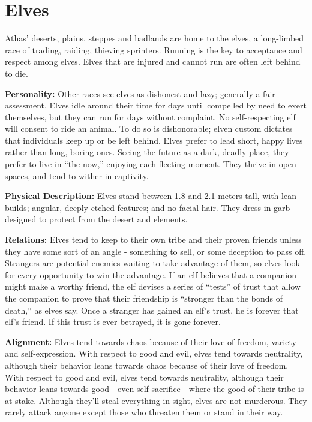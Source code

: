 \section{Elves}

Athas' deserts, plains, steppes and badlands are home to the elves, a long-limbed race of trading, raiding, thieving sprinters. Running is the key to acceptance and respect among elves. Elves that are injured and cannot run are often left behind to die.

\textbf{Personality:} Other races see elves as dishonest and lazy; generally a fair assessment. Elves idle around their time for days until compelled by need to exert themselves, but they can run for days without complaint. No self-respecting elf will consent to ride an animal. To do so is dishonorable; elven custom dictates that individuals keep up or be left behind. Elves prefer to lead short, happy lives rather than long, boring ones. Seeing the future as a dark, deadly place, they prefer to live in ``the now,'' enjoying each fleeting moment. They thrive in open spaces, and tend to wither in captivity.

\textbf{Physical Description:} Elves stand between 1.8 and 2.1 meters tall, with lean builds; angular, deeply etched features; and no facial hair. They dress in garb designed to protect from the desert and elements.

\textbf{Relations:} Elves tend to keep to their own tribe and their proven friends unless they have some sort of an angle - something to sell, or some deception to pass off. Strangers are potential enemies waiting to take advantage of them, so elves look for every opportunity to win the advantage. If an elf believes that a companion might make a worthy friend, the elf devises a series of ``tests'' of trust that allow the companion to prove that their friendship is ``stronger than the bonds of death,'' as elves say. Once a stranger has gained an elf's trust, he is forever that elf's friend. If this trust is ever betrayed, it is gone forever.


\textbf{Alignment:} Elves tend towards chaos because of their love of freedom, variety and self-expression. With respect to good and evil, elves tend towards neutrality, although their behavior leans towards chaos because of their love of freedom. With respect to good and evil, elves tend towards neutrality, although their behavior leans towards good - even self-sacrifice---where the good of their tribe is at stake. Although they'll steal everything in sight, elves are not murderous. They rarely attack anyone except those who threaten them or stand in their way.

